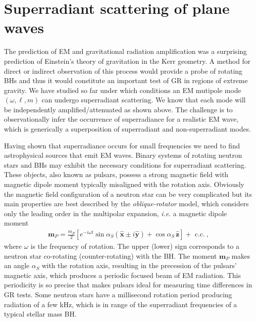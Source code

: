 
\chapter{Superradiant scattering of plane waves} %
\label{Chapter5}

The prediction of EM and gravitational radiation amplification was a surprising prediction of Einstein's theory of gravitation in the Kerr geometry.
A method for direct or indirect observation of this process would provide a probe of rotating BHs and thus it would constitute an important test of GR in regions of extreme gravity.
We have studied so far under which conditions an EM mutipole mode $(\omega,\ell, m)$ can undergo superradiant scattering.
We know that each mode will be independently amplified/attenuated as shown above.
The challenge is to observationally infer the occurrence of superradiance for a realistic EM wave, which is generically a superposition of superradiant and non-superradiant modes.

Having shown that superradiance occurs for small frequencies we need to find astrophysical sources that emit EM waves.
Binary systems of rotating neutron stars and BHs may exhibit the necessary conditions for superradiant scattering.
These objects, also known as pulsars, possess a strong magnetic field with magnetic dipole moment typically misaligned with the rotation axis.
Obviously the magnetic field configuration of a neutron star can be very complicated but its main properties are best described by the \emph{oblique-rotator} model, which considers only the leading order in the multipolar expansion, \emph{i.e.} a magnetic dipole moment
\begin{align}
    \mathbf{m}_P = \frac{m_P}{2} \left[ e^{-i \omega t} \sin\alpha_S ( \mathbf{\hat{x}} \pm i \mathbf{\hat{y}}) + \cos\alpha_S \,\mathbf{\hat{z}} \right] + \text{ c.c.} ~,
\end{align}
where $\omega$ is the frequency of rotation.
The upper (lower) sign corresponds to a neutron star co-rotating (counter-rotating) with the BH.
The moment $\mathbf{m}_P$ makes an angle $\alpha_S$ with the rotation axis, resulting in the precession of the pulsars' magnetic axis, which produces a periodic focused beam of EM radiation.
This periodicity is so precise that makes pulsars ideal for measuring time differences in GR tests.
Some neutron stars have a millisecond rotation period producing radiation of a few kHz, which is in range of the superradiant frequencies of a typical stellar mass BH.  

